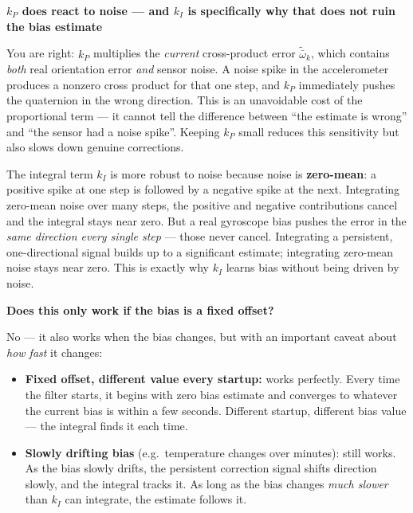 \documentclass[12pt, a4paper]{article}
\begin{document}
\begin{notebox}
  \textbf{$k_P$ does react to noise --- and $k_I$ is specifically why
  that does not ruin the bias estimate}

  You are right: $k_P$ multiplies the \emph{current} cross-product error
  $\tilde{\bar{\omega}}_k$, which contains \emph{both} real orientation
  error \emph{and} sensor noise.
  A noise spike in the accelerometer produces a nonzero cross product for
  that one step, and $k_P$ immediately pushes the quaternion in the wrong
  direction.
  This is an unavoidable cost of the proportional term --- it cannot tell
  the difference between ``the estimate is wrong'' and ``the sensor had
  a noise spike''.
  Keeping $k_P$ small reduces this sensitivity but also slows down
  genuine corrections.

  The integral term $k_I$ is more robust to noise because noise is
  \textbf{zero-mean}: a positive spike at one step is followed by a
  negative spike at the next.
  Integrating zero-mean noise over many steps, the positive and negative
  contributions cancel and the integral stays near zero.
  But a real gyroscope bias pushes the error in the \emph{same direction
  every single step} --- those never cancel.
  Integrating a persistent, one-directional signal builds up to a
  significant estimate; integrating zero-mean noise stays near zero.
  This is exactly why $k_I$ learns bias without being driven by noise.

  \textbf{Does this only work if the bias is a fixed offset?}

  No --- it also works when the bias changes, but with an important caveat
  about \emph{how fast} it changes:

  \begin{itemize}[leftmargin=1.2em, itemsep=3pt]
    \item \textbf{Fixed offset, different value every startup:} works
      perfectly.
      Every time the filter starts, it begins with zero bias estimate and
      converges to whatever the current bias is within a few seconds.
      Different startup, different bias value --- the integral finds it
      each time.

    \item \textbf{Slowly drifting bias} (e.g.\ temperature changes over
      minutes): still works.
      As the bias slowly drifts, the persistent correction signal shifts
      direction slowly, and the integral tracks it.
      As long as the bias changes \emph{much slower} than $k_I$ can
      integrate, the estimate follows it.


\end{itemize}
\end{notebox}
\end{document}
